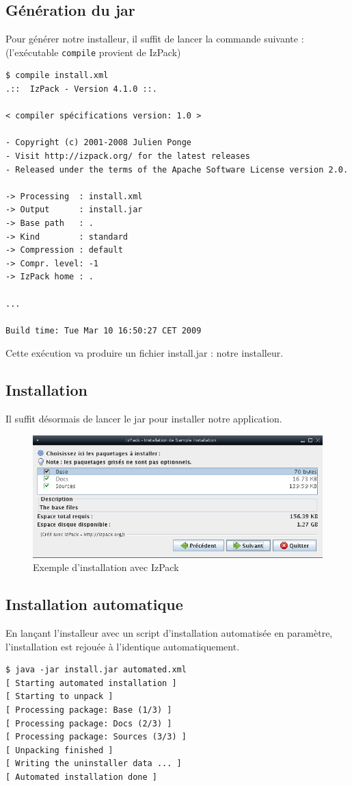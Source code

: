 \subsection{Génération du jar}
Pour générer notre installeur, il suffit de lancer la commande suivante : (l'exécutable \verb|compile| provient de IzPack)
\begin{verbatim}
$ compile install.xml
.::  IzPack - Version 4.1.0 ::.

< compiler spécifications version: 1.0 >

- Copyright (c) 2001-2008 Julien Ponge
- Visit http://izpack.org/ for the latest releases
- Released under the terms of the Apache Software License version 2.0.

-> Processing  : install.xml
-> Output      : install.jar
-> Base path   : .
-> Kind        : standard
-> Compression : default
-> Compr. level: -1
-> IzPack home : .

...

Build time: Tue Mar 10 16:50:27 CET 2009
\end{verbatim}
Cette exécution va produire un fichier install.jar : notre installeur.
\subsection{Installation}
Il suffit désormais de lancer le jar pour installer notre application.
\begin{figure}[H]
	\centering
	\includegraphics[width=15cm]{../image/installSample.png}
	\caption{Exemple d'installation avec IzPack}
\end{figure}
\subsection{Installation automatique}
En lançant l'installeur avec un script d'installation automatisée en paramètre, l'installation est rejouée à l'identique automatiquement.
\begin{verbatim}
$ java -jar install.jar automated.xml
[ Starting automated installation ]
[ Starting to unpack ]
[ Processing package: Base (1/3) ]
[ Processing package: Docs (2/3) ]
[ Processing package: Sources (3/3) ]
[ Unpacking finished ]
[ Writing the uninstaller data ... ]
[ Automated installation done ]
\end{verbatim}

